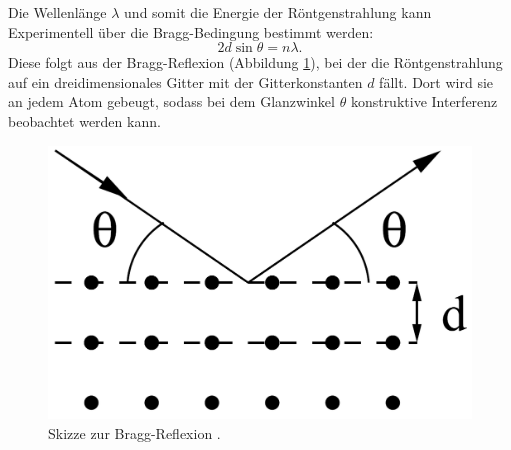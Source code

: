 \noindent Die Wellenlänge $\lambda$ und somit die Energie der Röntgenstrahlung kann Experimentell über die Bragg-Bedingung bestimmt werden:
\begin{equation}
2d\sin\theta = n\lambda\text{.}\label{eq:Bragg}
\end{equation}
Diese folgt aus der Bragg-Reflexion (Abbildung \ref{fig:Bragg}), bei der die Röntgenstrahlung auf ein dreidimensionales Gitter mit der Gitterkonstanten $d$ fällt. Dort wird sie an jedem Atom gebeugt, sodass bei dem Glanzwinkel $\theta$ konstruktive Interferenz beobachtet werden kann.

\begin{figure}
\centering
\includegraphics[scale=0.2]{content/images/BraggReflexion.png}
\caption{Skizze zur Bragg-Reflexion \cite{V602}.}
\label{fig:Bragg}
\end{figure}